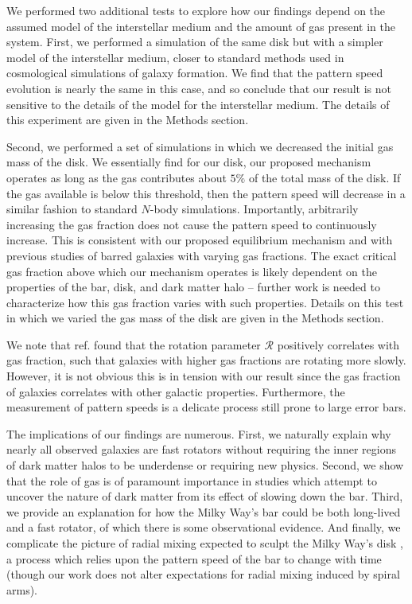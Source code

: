 \documentclass{natureprintstyle}
\newcommand{\Rot}{\ensuremath{\mathcal{R}}}
\newcommand{\Nbody}{$N$-body}
\begin{document}
We performed two additional tests to explore how our findings depend on the
assumed model of the interstellar medium and the amount of gas present in the
system. First, we performed a simulation of the same disk but with a simpler
model of the interstellar medium\cite{2003MNRAS.339..289S}, closer to standard
methods used in cosmological simulations of galaxy formation. We find that the
pattern speed evolution is nearly the same in this case, and so conclude that
our result is not sensitive to the details of the model for the interstellar
medium. The details of this experiment are given in the Methods section.

Second, we performed a set of simulations in which we decreased the initial
gas mass of the disk. We essentially find for our disk, our proposed mechanism
operates as long as the gas contributes about $5\%$ of the total mass of the
disk. If the gas available is below this threshold, then the pattern speed
will decrease in a similar fashion to standard \Nbody{} simulations.
Importantly, arbitrarily increasing the gas fraction does not cause the
pattern speed to continuously increase. This is consistent with our proposed
equilibrium mechanism and with previous studies of barred galaxies with varying gas fractions.\cite{2010ApJ...719.1470V} The exact critical gas
fraction above which our mechanism operates is likely dependent on the
properties of the bar, disk, and dark matter halo -- further work is needed to
characterize how this gas fraction varies with such properties. Details on
this test in which we varied the gas mass of the disk are given in the Methods
section.

We note that ref.\cite{2020MNRAS.491.3655G} found that the rotation parameter
\Rot{} positively correlates with gas fraction, such that galaxies with higher
gas fractions are rotating more slowly. However, it is not obvious this is in
tension with our result since the gas fraction of galaxies correlates with
other galactic properties.\cite{2009ARAA..47..159B} Furthermore, the
measurement of pattern speeds is a delicate process still prone to large error
bars.

The implications of our findings are numerous. First, we naturally explain why
nearly all observed galaxies are fast rotators without requiring the inner
regions of dark matter halos to be underdense\cite{1998ApJ...493L...5D,
2000ApJ...543..704D} or requiring new physics.\cite{2021MNRAS.503.2833R,
2021MNRAS.508..926R} Second, we show that the role of gas is of paramount
importance in studies which attempt to uncover the nature of dark matter from
its effect of slowing down the bar.\cite{2021MNRAS.500.4710C,
2021MNRAS.505.2412C} Third, we provide an explanation for how the Milky Way's
bar could be both long-lived and a fast rotator, of which there is some
observational evidence.\cite{2019MNRAS.490.4740B} And finally, we complicate
the picture of radial mixing expected to sculpt the Milky Way's disk
\cite{2012MNRAS.420..913B, 2015ApJ...808..132H}, a process which relies upon
the pattern speed of the bar to change with time (though our work does not
alter expectations for radial mixing induced by spiral
arms\cite{2002MNRAS.336..785S}).
\end{document}
